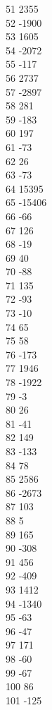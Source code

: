 { 51	2355 \\
 52	-1900 \\
 53	1605 \\
 54	-2072 \\
 55	-117 \\
 56	2737 \\
 57	-2897 \\
 58	281 \\
 59	-183 \\
 60	197 \\
 61	-73 \\
 62	26 \\
 63	-73 \\
 64	15395 \\
 65	-15406 \\
 66	-66 \\
 67	126 \\
 68	-19 \\
 69	40 \\
 70	-88 \\
 71	135 \\
 72	-93 \\
 73	-10 \\
 74	65 \\
 75	58 \\
 76	-173 \\
 77	1946 \\
 78	-1922 \\
 79	-3 \\
 80	26 \\
 81	-41 \\
 82	149 \\
 83	-133 \\
 84	78 \\
 85	2586 \\
 86	-2673 \\
 87	103 \\
 88	5 \\
 89	165 \\
 90	-308 \\
 91	456 \\
 92	-409 \\
 93	1412 \\
 94	-1340 \\
 95	-63 \\
 96	-47 \\
 97	171 \\
 98	-60 \\
 99	-67 \\
 100	86 \\
 101	-125 \\
}
